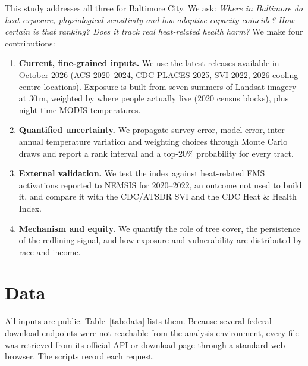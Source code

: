 \documentclass[11pt]{article}
\begin{document}
This study addresses all three for Baltimore City. We ask: \emph{Where in Baltimore do heat exposure, physiological sensitivity and low adaptive capacity coincide? How certain is that ranking? Does it track real heat-related health harm?} We make four contributions:
\begin{enumerate}
  \item \textbf{Current, fine-grained inputs.} We use the latest releases available in October 2026 (ACS 2020--2024, CDC PLACES 2025, SVI 2022, 2026 cooling-centre locations). Exposure is built from seven summers of Landsat imagery at 30\,m, weighted by where people actually live (2020 census blocks), plus night-time MODIS temperatures.
  \item \textbf{Quantified uncertainty.} We propagate survey error, model error, inter-annual temperature variation and weighting choices through \MCdraws{} Monte Carlo draws and report a rank interval and a top-20\% probability for every tract.
  \item \textbf{External validation.} We test the index against heat-related EMS activations reported to NEMSIS for 2020--2022, an outcome not used to build it, and compare it with the CDC/ATSDR SVI and the CDC Heat \& Health Index.
  \item \textbf{Mechanism and equity.} We quantify the role of tree cover, the persistence of the redlining signal, and how exposure and vulnerability are distributed by race and income.
\end{enumerate}

\section{Data}

All inputs are public. Table~\ref{tab:data} lists them. Because several federal download endpoints were not reachable from the analysis environment, every file was retrieved from its official API or download page through a standard web browser. The scripts record each request.
\end{document}
